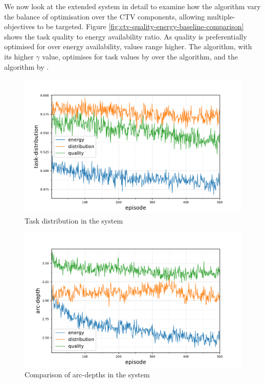 We now look at the extended system in detail to examine how the algorithm vary the balance  of optimisation over the CTV components, allowing multiple-objectives to be targeted. Figure 	\ref{fig:ctv-quality-energy-baseline-comparison} shows the task quality to energy availability ratio. 
As quality is preferentially optimised for over energy availability, values range higher. The \algorithmQuality{}{} algorithm, with its higher $\gamma$ value, optimises for task values by \resultsQEQualityEnd{}{} over the \algorithmEnergy{}{} algorithm, and the \algorithmDistribution{}{} algorithm by \resultsQEDistDiff{}{}. 
\begin{figure}
	\centering
	\includegraphics[width=0.7\linewidth]{5.19_ctv-task-distribution-comparison}
	\caption{Task distribution in the \simulationExtended{}{} system}
	\label{fig:ctv-task-distribution-comparison}
\end{figure}
\begin{figure}
	\centering
	\includegraphics[width=0.7\linewidth]{5.19_ctv-arc-depth-comparison}
	\caption{Comparison of arc-depths in the \simulationExtended{}{} system}
	\label{fig:ctv-arc-depth-comparison}
\end{figure}

